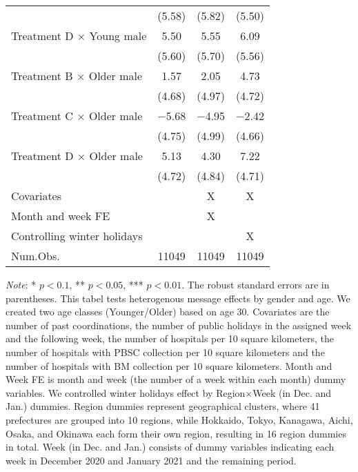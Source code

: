 \documentclass[12pt, a4paper]{article}
\begin{document}
\begin{table}[H]
\begin{threeparttable}
\begin{tabular}[t]{lccc}
 & (\num{5.58}) & (\num{5.82}) & (\num{5.50})\\
Treatment D $\times$ Young male & \num{5.50} & \num{5.55} & \num{6.09}\\
 & (\num{5.60}) & (\num{5.70}) & (\num{5.56})\\
Treatment B $\times$ Older male & \num{1.57} & \num{2.05} & \num{4.73}\\
 & (\num{4.68}) & (\num{4.97}) & (\num{4.72})\\
Treatment C $\times$ Older male & \num{-5.68} & \num{-4.95} & \num{-2.42}\\
 & (\num{4.75}) & (\num{4.99}) & (\num{4.66})\\
Treatment D $\times$ Older male & \num{5.13} & \num{4.30} & \num{7.22}\\
 & (\num{4.72}) & (\num{4.84}) & (\num{4.71})\\
\midrule
Covariates &  & X & X\\
Month and week FE &  & X & \\
Controlling winter holidays &  &  & X\\
Num.Obs. & \num{11049} & \num{11049} & \num{11049}\\
\bottomrule
\end{tabular}
\begin{tablenotes}
\item \emph{Note}: * $p < 0.1$, ** $p < 0.05$, *** $p < 0.01$. The robust standard errors are in parentheses. This tabel tests heterogenous message effects by gender and age. We created two age classes (Younger/Older) based on age 30. Covariates are the number of past coordinations, the number of public holidays in the assigned week and the following week, the number of hospitals per 10 square kilometers, the number of hospitals with PBSC collection per 10 square kilometers and the number of hospitals with BM collection per 10 square kilometers. Month and Week FE is month and week (the number of a week within each month) dummy variables. We controlled winter holidays effect by Region$\times$Week (in Dec. and Jan.) dummies. Region dummies represent geographical clusters, where 41 prefectures are grouped into 10 regions, while Hokkaido, Tokyo, Kanagawa, Aichi, Osaka, and Okinawa each form their own region, resulting in 16 region dummies in total. Week (in Dec. and Jan.) consists of dummy variables indicating each week in December 2020 and January 2021 and the remaining period.
\end{tablenotes}
\end{threeparttable}
\end{table}
\end{document}
